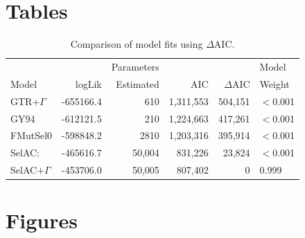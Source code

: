 \documentclass{article}
\newcommand{\DeltaAIC}{\ensuremath{\Delta\text{AIC}}\xspace}
\newcommand{\selac}{SelAC\xspace}
\newcommand{\selacplusgamma}{SelAC$+\Gamma$\xspace}
\begin{document}





\clearpage

\section*{Tables}
  \begin{table}
    \begin{tabular}{lrrrrl}
      &          &Parameters &          &        & Model\\
      Model                 	& logLik   & Estimated &     AIC& \DeltaAIC&  Weight\\\hline
      GTR+$\Gamma$        		& -655166.4&        610& 1,311,553& 504,151&$<$0.001\\
      GY94                  	& -612121.5&        210& 1,224,663& 417,261&$<$0.001\\
      FMutSel0              		& -598848.2&       2810& 1,203,316& 395,914&$<$0.001\\
      \selac:          	        & -465616.7&       50,004&   831,226&  23,824&$<$0.001\\
      \selacplusgamma 	        & -453706.0&       50,005&   807,402&       0& 0.999
    \end{tabular}
    \caption{Comparison of model fits using $\DeltaAIC$.}
    \label{table:modelFits}
\end{table}



\clearpage %

\section*{Figures}
\end{document}
